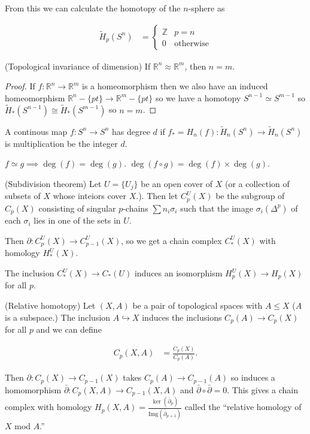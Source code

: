 From this we can calculate the homotopy of the $n$-sphere as 

\begin{align*}
\tilde{H}_{p}(S^{n}) & =\begin{cases}
\mathbb{Z} & p=n\\
0 & \text{otherwise}
\end{cases}
\end{align*}

\begin{thm}
(Topological invariance of dimension) If $\mathbb{R}^{n}\approx\mathbb{R}^{m}$,
then $n=m$. \end{thm}
\begin{proof}
If $f:\mathbb{R}^{n}\to\mathbb{R}^{m}$ is a homeomorphism then we
also have an induced homeomorphism $\mathbb{R}^{n}-\{pt\}\to\mathbb{R}^{m}-\{pt\}$
so we have a homotopy $S^{n-1}\simeq S^{m-1}$ so $\tilde{H}_{*}(S^{n-1})\cong\tilde{H}_{*}(S^{m-1})$
so $n=m$.\end{proof}
\begin{defn}
A continous map $f:S^{n}\to S^{n}$ has degree $d$ if $f_{*}=H_{n}(f):\tilde{H}_{n}(S^{n})\to\tilde{H}_{n}(S^{n})$
is multiplication be the integer $d$.\end{defn}
\begin{rem}
$f\simeq g\implies\deg(f)=\deg(g)$. $\deg(f\circ g)=\deg(f)\times\deg(g)$.\end{rem}
\begin{thm}
(Subdivision theorem) Let $U=\{U_{j}\}$ be an open cover of $X$
(or a collection of subsets of $X$ whose inteiors cover $X$.). Then
let $C_{p}^{U}(X)$ be the subgroup of $C_{p}(X)$ consisting of singular
$p$-chains $\sum n_{i}\sigma_{i}$ such that the image $\sigma_{i}(\Delta^{p})$
of each $\sigma_{i}$ lies in one of the sets in $U$.

Then $\partial:C_{p}^{U}(X)\to C_{p-1}^{U}(X)$, so we get a chain
complex $C_{*}^{U}(X)$ with homology $H_{*}^{U}(X)$.

The inclusion $C_{*}^{U}(X)\to C_{*}(U)$ induces an isomorphism $H_{p}^{U}(X)\to H_{p}(X)$
for all $p$.\end{thm}
\begin{defn}
(Relative homotopy) Let $(X,A)$ be a pair of topological spaces with
$A\leq X$ ($A$ is a subspace.) The inclusion $A\hookrightarrow X$
induces the inclusions $C_{p}(A)\to C_{p}(X)$ for all $p$ and we
can define

\begin{align*}
C_{p}(X,A) & =\frac{C_{p}(X)}{C_{p}(A)}.
\end{align*}

\end{defn}
Then $\partial:C_{p}(X)\to C_{p-1}(X)$ takes $C_{p}(A)\to C_{p-1}(A)$
so induces a homomorphism $\bar{\partial}:C_{p}(X,A)\to C_{p-1}(X,A)$
and $\bar{\partial}\circ\bar{\partial}=0$. This gives a chain complex
with homology $H_{p}(X,A)=\frac{\ker(\bar{\partial}_{p})}{\text{Img}(\bar{\partial}_{p+1})}$
called the ``relative homology of $X$ mod $A$.''

